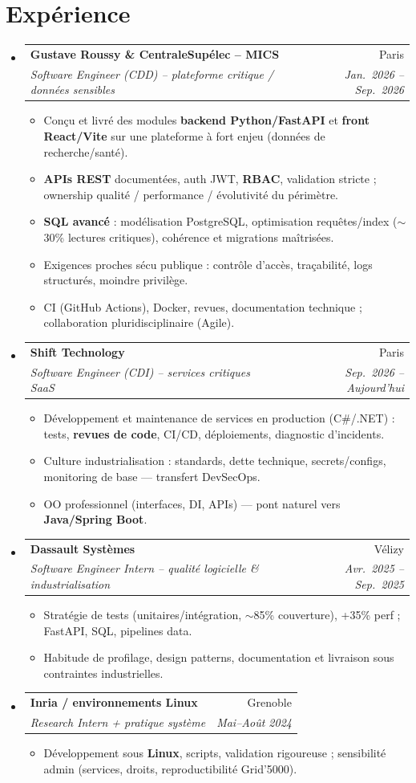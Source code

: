 \documentclass[a4paper,10.5pt]{article}
\makeatletter
\newcommand{\resumeItem}[1]{\item\small{#1}}
\newcommand{\resumeSubheading}[4]{\vspace{3pt}\item\begin{tabular*}{0.97\textwidth}[t]{l@{\extracolsep{\fill}}r}\textbf{#1}&{#2}\\\textit{\small #3}&\textit{\small #4}\\\end{tabular*}\vspace{1pt}}
\newcommand{\resumeSubHeadingListStart}{\begin{itemize}[leftmargin=0.08in,label={}]}
\newcommand{\resumeSubHeadingListEnd}{\end{itemize}}
\makeatother
\begin{document}
\section{Exp\'erience}
\resumeSubHeadingListStart
  \resumeSubheading
    {Gustave Roussy \& CentraleSup\'elec -- MICS}{Paris}
    {Software Engineer (CDD) -- plateforme critique / donn\'ees sensibles}{Jan.~2026 -- Sep.~2026}
    \begin{itemize}
      \resumeItem{Con\c{c}u et livr\'e des modules \textbf{backend Python/FastAPI} et \textbf{front React/Vite} sur une plateforme \`a fort enjeu (donn\'ees de recherche/sant\'e).}
      \resumeItem{\textbf{APIs REST} document\'ees, auth JWT, \textbf{RBAC}, validation stricte ; ownership qualit\'e / performance / \'evolutivit\'e du p\'erim\`etre.}
      \resumeItem{\textbf{SQL avanc\'e} : mod\'elisation PostgreSQL, optimisation requ\^etes/index ($\sim$30\% lectures critiques), coh\'erence et migrations ma\^itris\'ees.}
      \resumeItem{Exigences proches s\'ecu publique : contr\^ole d'acc\`es, tra\c{c}abilit\'e, logs structur\'es, moindre privil\`ege.}
      \resumeItem{CI (GitHub Actions), Docker, revues, documentation technique ; collaboration pluridisciplinaire (Agile).}
    \end{itemize}
  \resumeSubheading
    {Shift Technology}{Paris}
    {Software Engineer (CDI) -- services critiques SaaS}{Sep.~2026 -- Aujourd'hui}
    \begin{itemize}
      \resumeItem{D\'eveloppement et maintenance de services en production (C\#/.NET) : tests, \textbf{revues de code}, CI/CD, d\'eploiements, diagnostic d'incidents.}
      \resumeItem{Culture industrialisation : standards, dette technique, secrets/configs, monitoring de base --- transfert DevSecOps.}
      \resumeItem{OO professionnel (interfaces, DI, APIs) --- pont naturel vers \textbf{Java/Spring Boot}.}
    \end{itemize}
  \resumeSubheading
    {Dassault Syst\`emes}{V\'elizy}
    {Software Engineer Intern -- qualit\'e logicielle \& industrialisation}{Avr.~2025 -- Sep.~2025}
    \begin{itemize}
      \resumeItem{Strat\'egie de tests (unitaires/int\'egration, $\sim$85\% couverture), +35\% perf ; FastAPI, SQL, pipelines data.}
      \resumeItem{Habitude de profilage, design patterns, documentation et livraison sous contraintes industrielles.}
    \end{itemize}
  \resumeSubheading
    {Inria / environnements Linux}{Grenoble}
    {Research Intern + pratique syst\`eme}{Mai--Ao\^ut 2024}
    \begin{itemize}
      \resumeItem{D\'eveloppement sous \textbf{Linux}, scripts, validation rigoureuse ; sensibilit\'e admin (services, droits, reproductibilit\'e Grid'5000).}
    \end{itemize}
\resumeSubHeadingListEnd
\end{document}

